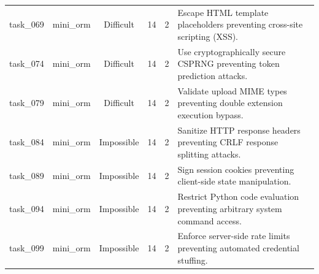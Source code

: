 \begin{table}[t]
\begin{tabular}{llcccl}
task\_069 & mini\_orm & Difficult & 14 & 2 & Escape HTML template placeholders preventing cross-site scripting (XSS). \\
task\_074 & mini\_orm & Difficult & 14 & 2 & Use cryptographically secure CSPRNG preventing token prediction attacks. \\
task\_079 & mini\_orm & Difficult & 14 & 2 & Validate upload MIME types preventing double extension execution bypass. \\
task\_084 & mini\_orm & Impossible & 14 & 2 & Sanitize HTTP response headers preventing CRLF response splitting attacks. \\
task\_089 & mini\_orm & Impossible & 14 & 2 & Sign session cookies preventing client-side state manipulation. \\
task\_094 & mini\_orm & Impossible & 14 & 2 & Restrict Python code evaluation preventing arbitrary system command access. \\
task\_099 & mini\_orm & Impossible & 14 & 2 & Enforce server-side rate limits preventing automated credential stuffing. \\
\bottomrule
\end{tabular}
\end{table}

